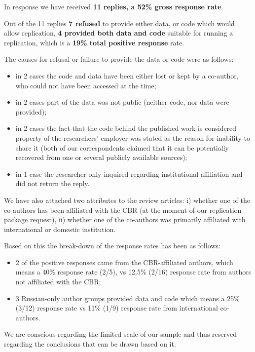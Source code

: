 \documentclass[12pt]{article}
\begin{document}
In response we have received {\bf 11 replies, a 52\% gross response rate}. 

Out of the 11 replies {\bf 7 refused} to provide either data, or code which would allow replication, {\bf 4 provided both data and code} suitable for running a replication, which is a {\bf 19\% total positive response} rate. 

The causes for refusal or failure to provide the data or code were as follows:

\begin{itemize}
    \item in 2 cases the code and data have been either lost or kept by a co-author, who could not have been accessed at the time;
    \item in 2 cases part of the data was not public (neither code, nor data were provided);
    \item in 2 cases the fact that the code behind the published work is considered property of the researchers'  employer was stated as the reason for inability to share it (both of our correspondents claimed that it can be potentially recovered from one or several publicly available sources);
    \item in 1 case the researcher only inquired regarding institutional affiliation and did not return the reply. 
\end{itemize}

We have also attached two attributes to the review articles: i) whether one of the co-authors has been affiliated with the CBR (at the moment of our replication package request), ii) whether one of the co-authors was primarily affiliated with international or domestic institution.

Based on this the break-down of the response rates has been as follows: 

\begin{itemize}
    \item 2 of the positive responses came from the CBR-affiliated authors, which means a 40\% response rate (2/5), vs 12.5\% (2/16) response rate from authors not affiliated with the CBR;
    \item 3 Russian-only author groups provided data and code which means a 25\% (3/12) response rate vs 11\% (1/9) response rate from international co-authors. 
\end{itemize}

We are conscious regarding the limited scale of our sample and thus reserved regarding the conclusions that can be drawn based on it. 
\end{document}
